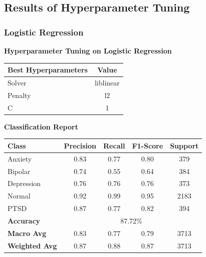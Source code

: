 
\subsection{Results of Hyperparameter Tuning}

\subsubsection{Logistic Regression}
\begin{center}
    \textbf{Hyperparameter Tuning on Logistic Regression} \\[0.5em]
    \begin{tabular}{|l|c|}
        \hline
        \textbf{Best Hyperparameters}  & \textbf{Value} \\ \hline
        Solver                        & liblinear      \\ \hline
        Penalty                       & l2             \\ \hline
        C                              & 1              \\ \hline
    \end{tabular}
\end{center}

\begin{center}
    \textbf{Classification Report} \\[0.5em]
    \begin{tabular}{|l|c|c|c|c|}
        \hline
        \textbf{Class} & \textbf{Precision} & \textbf{Recall} & \textbf{F1-Score} & \textbf{Support} \\ \hline
        Anxiety        & 0.83               & 0.77            & 0.80              & 379             \\ \hline
        Bipolar        & 0.74               & 0.55            & 0.64              & 384             \\ \hline
        Depression     & 0.76               & 0.76            & 0.76              & 373             \\ \hline
        Normal         & 0.92               & 0.99            & 0.95              & 2183            \\ \hline
        PTSD           & 0.87               & 0.77            & 0.82              & 394             \\ \hline
        \textbf{Accuracy} & \multicolumn{4}{|c|}{87.72\%} \\ \hline
        \textbf{Macro Avg} & 0.83            & 0.77            & 0.79              & 3713            \\ \hline
        \textbf{Weighted Avg} & 0.87         & 0.88            & 0.87              & 3713            \\ \hline
    \end{tabular}
\end{center}


